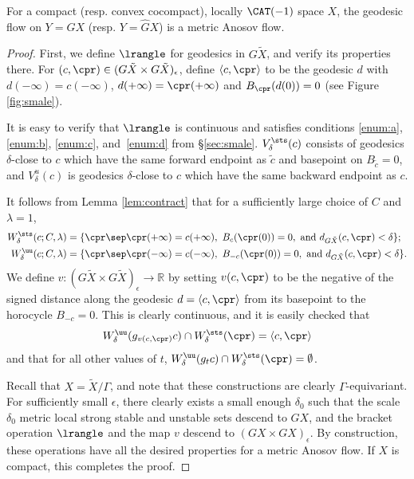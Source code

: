 \begin{thm} \label{t.smale}
For a compact (resp. convex cocompact), locally $\CAT(-1)$ space $X$, the geodesic flow on $Y= GX$ (resp. $Y=\hat GX$) is a metric Anosov flow.
\end{thm}

\begin{proof}
First, we define $\lrangle$ for geodesics in $G\tilde X$, and verify its properties there. For $(c,\cpr)\in (G\tilde X \times G\tilde X)_\epsilon$, define $\langle c,\cpr\rangle $ to be the geodesic $d$ with $d(-\infty) = c(-\infty)$, $d(+\infty) = \cpr(+\infty)$ and $B_{\cpr}(d(0)) = 0$ (see Figure \ref{fig:smale}).

It is easy to verify that $\lrangle$ is continuous and satisfies conditions \eqref{enum:a}, \eqref{enum:b}, \eqref{enum:c}, and~\eqref{enum:d} from \S \ref{sec:smale}. $V_\delta^{\sts}(c)$ consists of geodesics $\delta$-close to $c$ which have the same forward endpoint as $\tilde c$ and basepoint on $B_{\tilde c} = 0$, and $V_\delta^u(c)$ is geodesics $\delta$-close to $c$ which have the same backward endpoint as $c$.

It follows from Lemma \ref{lem:contract} that for a sufficiently large choice of $C$ and $\lambda = 1$,
\begin{align*}
W^{\sts}_\delta(c;C,\lambda) &= \{\cpr\sep \cpr(+\infty) = c(+\infty), \ B_{c}(\cpr(0))=0, \mbox{ and } d_{G\tilde X}(c,\cpr)<\delta \}; \\
W^{\uu}_\delta(c;C,\lambda) &= \{\cpr\sep \cpr(-\infty) = c(-\infty), \ B_{-c}(\cpr(0))=0, \mbox{ and } d_{G\tilde X}(c,\cpr)<\delta \}. 
\end{align*}
We define $v:(G\tilde X\times G\tilde X)_\epsilon \to \mathbb{R}$ by setting $v(c,\cpr)$ to be the negative of the signed distance along the geodesic $d = \langle c,\cpr\rangle $ from its basepoint to the horocycle $B_{-c}=0$. This is clearly continuous, and it is easily checked that
\[ W^{\uu}_\delta(g_{v(c,\cpr)}c) \cap W^{\sts}_\delta(\cpr) = \langle c,\cpr\rangle \]
and that for all other values of $t$, $W^{\uu}_\delta(g_tc) \cap W^{\sts}_\delta(\cpr) = \emptyset$.

Recall that $X = \tilde X /\Gamma$, and note that these constructions are clearly $\Gamma$-equivariant. For sufficiently small $\epsilon$, there clearly exists a small enough $\delta_0$ such that the scale $\delta_0$ metric local strong stable and unstable sets descend to $GX$, and the bracket operation $\lrangle$ and the map $v$ descend to $(GX \times GX)_\epsilon$. By construction, these operations have all the desired properties for a metric Anosov flow. If $X$ is compact, this completes the proof.


\end{proof}
